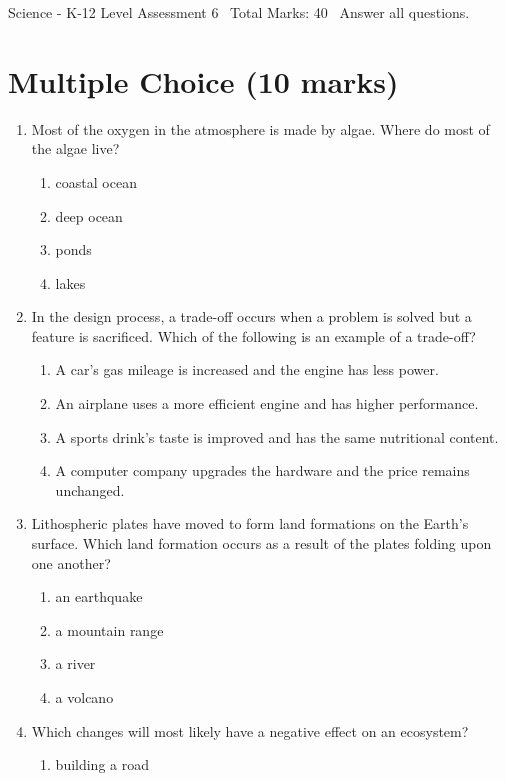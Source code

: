 \documentclass[12pt]{article}
\begin{document}
\begin{center}
Science - K-12 Level Assessment 6 \
Total Marks: 40 \
Answer all questions.
\end{center}

\section*{Multiple Choice (10 marks)}
\begin{enumerate}[label=\arabic*.]
\item Most of the oxygen in the atmosphere is made by algae. Where do most of the algae live?
\begin{enumerate}[label=(\alph*)]
    \item coastal ocean
    \item deep ocean
    \item ponds
    \item lakes
\end{enumerate}
\item In the design process, a trade-off occurs when a problem is solved but a feature is sacrificed. Which of the following is an example of a trade-off?
\begin{enumerate}[label=(\alph*)]
    \item A car's gas mileage is increased and the engine has less power.
    \item An airplane uses a more efficient engine and has higher performance.
    \item A sports drink's taste is improved and has the same nutritional content.
    \item A computer company upgrades the hardware and the price remains unchanged.
\end{enumerate}
\item Lithospheric plates have moved to form land formations on the Earth's surface. Which land formation occurs as a result of the plates folding upon one another?
\begin{enumerate}[label=(\alph*)]
    \item an earthquake
    \item a mountain range
    \item a river
    \item a volcano
\end{enumerate}
\item Which changes will most likely have a negative effect on an ecosystem?
\begin{enumerate}[label=(\alph*)]
    \item building a road

\end{enumerate}
\end{enumerate}
\end{document}
